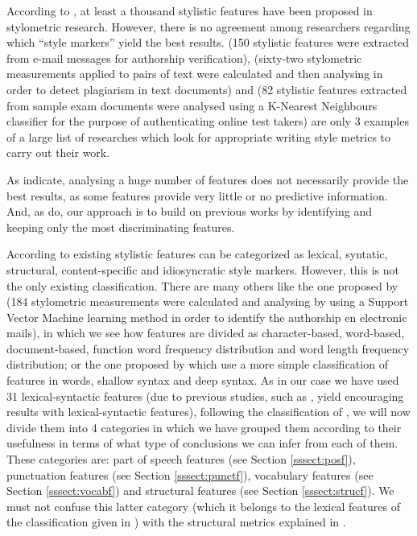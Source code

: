 According to \cite{rudman1997state}, at least a thousand stylistic features have been proposed in stylometric research. However, there is no agreement among researchers regarding which ``style markers'' yield the best results. \cite{chen2011authorship} (150 stylistic features were extracted from e-mail messages for authorship verification), \cite{gruner2005tool} (sixty-two stylometric measurements applied to pairs of text were calculated and then analysing in order to detect plagiarism in text documents) and \cite{canales2011stylometry} (82 stylistic features extracted from sample exam documents were analysed using a K-Nearest Neighbours classifier for the purpose of authenticating online test takers) are only 3 examples of a large list of researches which look for appropriate writing style metrics to carry out their work.

As \cite{brocardo2013authorship} indicate, analysing a huge number of features does not necessarily provide the best results, as some features provide very little or no predictive information. And, as \cite{brocardo2013authorship} do, our approach is to build on previous works by identifying and keeping only the most discriminating features.

According to \cite{abbasi2008writeprints} existing stylistic features can be categorized as lexical, syntatic, structural, content-specific and idiosyncratic style markers. However, this is not the only existing classification. There are many others like the one proposed by \cite{corney2001identifying} (184 stylometric measurements were calculated and analysing by using a Support Vector Machine learning method in order to identify the authorship en electronic mails), in which we see how features are divided as character-based, word-based, document-based, function word frequency distribution and word length frequency distribution; or the one proposed by \cite{cfgstylo} which use a more simple classification of features in words, shallow syntax and deep syntax. As in our case we have used 31 lexical-syntactic features (due to previous studies, such as \cite{homem2011authorship}, yield encouraging results with lexical-syntactic features), following the classification of \cite{abbasi2008writeprints}, we will now divide them into 4 categories in which we have grouped them according to their usefulness in terms of what type of conclusions we can infer from each of them. These categories are: part of speech features (see Section \ref{sssect:posf}), punctuation features (see Section \ref{sssect:punctf}), vocabulary features (see Section \ref{sssect:vocabf}) and structural features (see Section \ref{sssect:strucf}). We must not confuse this latter category (which it belongs to the lexical features of the classification given in \cite{abbasi2008writeprints}) with the structural metrics explained in \cite{abbasi2008writeprints}.

